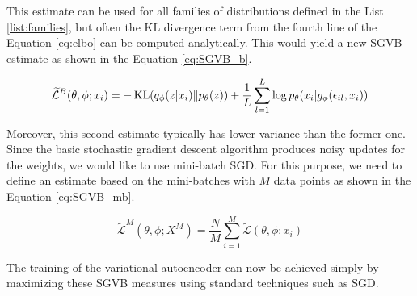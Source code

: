 This estimate can be used for all families of distributions defined in the List \ref{list:families}, but often the KL divergence term from the fourth line of the Equation \ref{eq:elbo} can be computed analytically.
This would yield a new SGVB estimate as shown in the Equation \ref{eq:SGVB_b}.

\begin{equation}
\begin{split}
    \widetilde{\mathcal{L}}^B(\theta, \phi; x_i) &= -\operatorname{KL}(q_{\phi}(z|x_i) \| p_{\theta}(z)) + \frac{1}{L}\sum_{l=1}^{L} \log p_{\theta}(x_i|g_{\phi}(\epsilon_{il}, x_i)) \\
\end{split}
\label{eq:SGVB_b}
\end{equation}

Moreover, this second estimate typically has lower variance than the former one.
Since the basic stochastic gradient descent algorithm produces noisy updates for the weights, we would like to use mini-batch SGD.
For this purpose, we need to define an estimate based on the mini-batches with $M$ data points as shown in the Equation \ref{eq:SGVB_mb}.

\begin{equation}
    \widetilde{\mathcal{L}}^M(\theta, \phi; X^M) = \frac{N}{M} \sum_{i=1}^{M} \widetilde{\mathcal{L}}(\theta, \phi; x_i)
    \label{eq:SGVB_mb}
\end{equation}

The training of the variational autoencoder can now be achieved simply by maximizing these SGVB measures using standard techniques such as SGD.